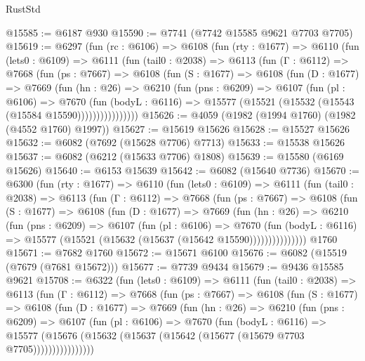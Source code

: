 \begin{lexlean}{RustStd}
\begin{coremodule}
@15585 := @6187 @930
@15590 := @7741 (@7742 @15585 @9621 @7703 @7705)
@15619 := @6297
    (fun (rc : @6106) =>
    @6108
      (fun (rty : @1677) =>
      @6110
        (fun (lets0 : @6109) =>
        @6111
          (fun (tail0 : @2038) =>
          @6113
            (fun (Γ : @6112) =>
            @7668
              (fun (ps : @7667) =>
              @6108
                (fun (S : @1677) =>
                @6108
                  (fun (D : @1677) =>
                  @7669
                    (fun (hn : @26) =>
                    @6210
                      (fun (pns : @6209) =>
                      @6107
                        (fun (pl : @6106) =>
                        @7670
                          (fun (bodyL : @6116) =>
                          @15577 (@15521 (@15532 (@15543 (@15584 @15590))))))))))))))))
@15626 := @4059 (@1982 (@1994 @1760) (@1982 (@4552 @1760) @1997))
@15627 := @15619 @15626
@15628 := @15527 @15626
@15632 := @6082 (@7692 (@15628 @7706) @7713)
@15633 := @15538 @15626
@15637 := @6082 (@6212 (@15633 @7706) @1808)
@15639 := @15580 (@6169 @15626)
@15640 := @6153 @15639
@15642 := @6082 (@15640 @7736)
@15670 := @6300
    (fun (rty : @1677) =>
    @6110
      (fun (lets0 : @6109) =>
      @6111
        (fun (tail0 : @2038) =>
        @6113
          (fun (Γ : @6112) =>
          @7668
            (fun (ps : @7667) =>
            @6108
              (fun (S : @1677) =>
              @6108
                (fun (D : @1677) =>
                @7669
                  (fun (hn : @26) =>
                  @6210
                    (fun (pns : @6209) =>
                    @6107
                      (fun (pl : @6106) =>
                      @7670
                        (fun (bodyL : @6116) =>
                        @15577 (@15521 (@15632 (@15637 (@15642 @15590)))))))))))))))
    @1760
@15671 := @7682 @1760
@15672 := @15671 @6100
@15676 := @6082 (@15519 (@7679 (@7681 @15672)))
@15677 := @7739 @9434
@15679 := @9436 @15585 @9621
@15708 := @6322
    (fun (lets0 : @6109) =>
    @6111
      (fun (tail0 : @2038) =>
      @6113
        (fun (Γ : @6112) =>
        @7668
          (fun (ps : @7667) =>
          @6108
            (fun (S : @1677) =>
            @6108
              (fun (D : @1677) =>
              @7669
                (fun (hn : @26) =>
                @6210
                  (fun (pns : @6209) =>
                  @6107
                    (fun (pl : @6106) =>
                    @7670
                      (fun (bodyL : @6116) =>
                      @15577
                        (@15676 (@15632 (@15637 (@15642 (@15677 (@15679 @7703 @7705))))))))))))))))

\end{coremodule}
\end{lexlean}
